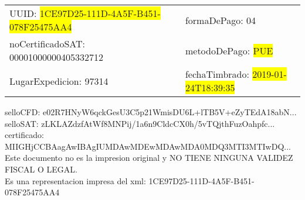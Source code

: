 \documentclass{article}
\begin{document}
\begin{tabular}{p{11cm}p{1cm}p{8cm}}
\bigskip
UUID: \colorbox{yellow}{ 1CE97D25-111D-4A5F-B451-078F25475AA4 } & & formaDePago: 04\\

noCertificadoSAT: 00001000000405332712 & & metodoDePago: \colorbox{yellow}{ PUE }\\

LugarExpedicion: 97314 & & fechaTimbrado: \colorbox{yellow}{ 2019-01-24T18:39:35 } \\
\end{tabular}

\bigskip
selloCFD: e02R7HNyW6qckGesU3C5p21WmisDU6L+lTB5V+eZyTEdA18abN... \\
selloSAT: zLKLAZdzfAtWf8MNPij/1a6n9CldcCX0h/5vTQjthFuzOahpfc... \\

certificado: MIIGHjCCBAagAwIBAgIUMDAwMDEwMDAwMDA0MDQ3MTI3MTIwDQ...\bigskip\bigskip\bigskip\bigskip\bigskip\bigskip
\\Este documento no es la impresion original y NO TIENE NINGUNA VALIDEZ FISCAL O LEGAL. \\
 Es una representacion impresa del xml:  1CE97D25-111D-4A5F-B451-078F25475AA4 \\
\end{document}
